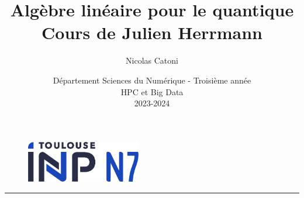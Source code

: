\documentclass{article}
\begin{document}
\begin{figure}[t]
\centering\includegraphics[width=5cm]{inp_n7.png}
\end{figure}

\title{\vspace{4cm} \textbf{Algèbre linéaire pour le quantique} \\ Cours de Julien Herrmann}
\author{Nicolas Catoni}

\date{\vspace{7cm}
  Département Sciences du Numérique - Troisième année \\ \vspace{3pt}
  HPC et Big Data \\ \vspace{3pt}
  2023-2024
}

\maketitle

\begin{center}
 \rule{0.5\linewidth}{1pt}
 \end{center}

\newpage
\tableofcontents
\listoffigures
\listoftheorems

\newpage



  
\end{document}
